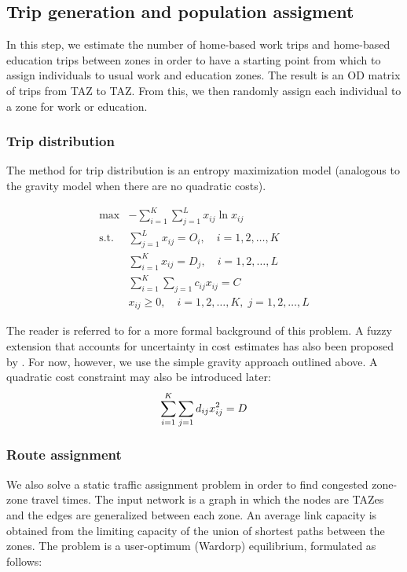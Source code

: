 \documentclass[11pt,twoside]{article}
\numberwithin{equation}{section}
\newcommand{\?}{\stackrel{?}{=}}
\begin{document}
\subsection{Trip generation and population assigment}
In this step, we estimate the number of home-based work trips and home-based education trips between zones in order to have a starting point from which to assign individuals to usual work and education zones.
The result is an OD matrix of trips from TAZ to TAZ.
From this, we then randomly assign each individual to a zone for work or education.

\subsubsection{Trip distribution}
The method for trip distribution is an entropy maximization model (analogous to the gravity model when there are no quadratic costs).

\begin{align}
  \max & - \sum_{i=1}^K\sum_{j=1}^L x_{ij} \ln x_{ij}\\
  \text{s.t.} & \sum_{j=1}^{L}x_{ij} = O_i, \quad i = 1,2, \dots,K\\
       & \sum_{i=1}^{K}x_{ij} = D_j, \quad i = 1,2, \dots,L\\
       &  \sum_{i=1}^K\sum_{j=1} c_{ij}x_{ij} = C \\
       & x_{ij} \ge 0, \quad i =1,2,\dots,K,\; j  =1,2,\dots,L
\end{align}

The reader is referred to \citet{fang1995linearly} for a more formal background of this problem.
A fuzzy extension that accounts for uncertainty in cost estimates has also been proposed by \citet{li2011entropy}.
For now, however, we use the simple gravity approach outlined above.
A quadratic cost constraint may also be introduced later:
\begin{equation}
   \sum_{i=1}^K\sum_{j=1} d_{ij}x_{ij}^2 = D \\
\end{equation}



\subsubsection{Route assignment}
We also solve a static traffic assignment problem in order to find congested zone-zone travel times.
The input network is a graph in which the nodes are TAZes and the edges are generalized between each zone.
An average link capacity is obtained from the limiting capacity of the union of shortest paths between the zones.
The problem is a user-optimum (Wardorp) equilibrium, formulated as follows:
\end{document}
